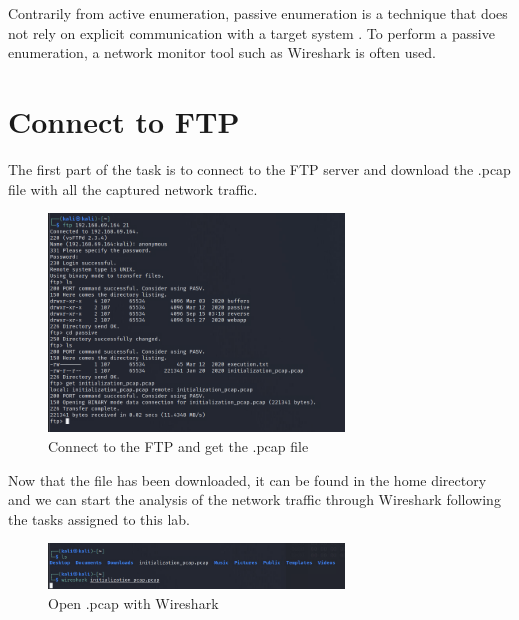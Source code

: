 Contrarily from active enumeration, passive enumeration is a technique that does
not rely on explicit communication with a target system
\citep{cooperWhatDifferenceActive2020}. To perform a passive enumeration, a
network monitor tool such as Wireshark is often used.

\section{Connect to FTP}
\label{s:Connect-To-FTP}
The first part of the task is to connect to the FTP server and download the .pcap
file with all the captured network traffic.

\begin{figure}[ht]
  \centering
  \includegraphics[width=0.7\textwidth]{figures/ftp-get-pcap}
  \caption{Connect to the FTP and get the .pcap file}
  \label{f:ftp-get-pcap}
\end{figure}

Now that the file has been downloaded, it can be found in the home directory
and we can start the analysis of the network traffic through Wireshark following the
tasks assigned to this lab.
\begin{figure}[ht]
  \centering
  \includegraphics[width=0.7\textwidth]{figures/wireshark-pcap}
  \caption{Open .pcap with Wireshark}
  \label{f:wireshark-pcap}
\end{figure}

